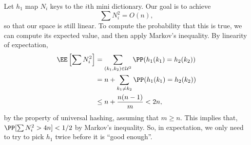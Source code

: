 Let $h_1$ map $N_i$ keys to the $i$th mini dictionary. Our goal is to achieve
\[\sum N_i^2 = O(n),\]
so that our space is still linear. To compute the probability that this is true, we can compute its expected value, and then apply Markov's inequality. By linearity of expectation, 
\begin{align*}
    \EE\left[\sum N_i^2\right] &= \sum_{(k_1, k_2)\in \mathcal{U}^2} \PP(h_1(k_1) = h_2(k_2)) \\
    &= n + \sum_{k_1\neq k_2} \PP(h_1(k_1) = h_2(k_2)) \\
    &\leq n + \frac{n(n-1)}{m} < 2n,
\end{align*}
by the property of universal hashing, assuming that $m\geq n$. This implies that, $\PP[\sum N_i^2 > 4n] < 1/2$ by Markov's inequality. So, in expectation, we only need to try to pick $h_1$ twice before it is ``good enough''. 
